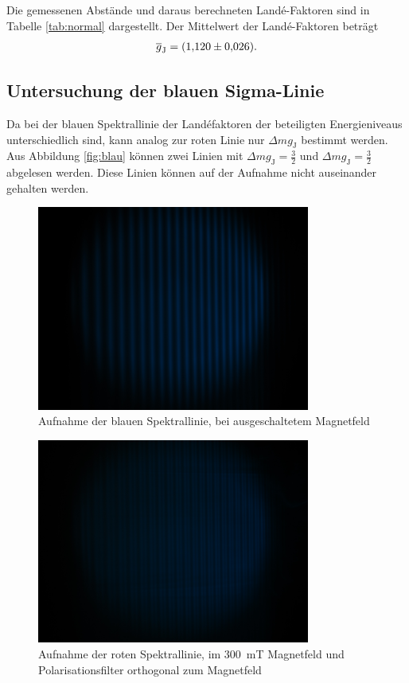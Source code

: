 Die gemessenen Abstände und daraus berechneten Landé-Faktoren sind in Tabelle \ref{tab:normal} dargestellt.
Der Mittelwert der Landé-Faktoren beträgt
\begin{align}
	\overline{g}_\text{J} = \SI{1.12 \pm 0.026}{}.
\end{align}

\subsection{Untersuchung der blauen Sigma-Linie}

Da bei der blauen Spektrallinie der Landéfaktoren der beteiligten Energieniveaus unterschiedlich sind, kann analog zur roten Linie nur $\Delta m g_\text{J}$ bestimmt werden.
Aus Abbildung \ref{fig:blau} können zwei Linien mit $\Delta m g_\text{J} = \frac{3}{2}$ und $\Delta m g_\text{J} = \frac{3}{2}$ abgelesen werden.
Diese Linien können auf der Aufnahme nicht auseinander gehalten werden.
\begin{figure}
	\centering
	\includegraphics[width=0.8\textwidth]{img/blau-0A.JPG}
	\caption{Aufnahme der blauen Spektrallinie, bei ausgeschaltetem Magnetfeld}
	\label{fig:blau1}
\end{figure}
\begin{figure}
	\centering
	\includegraphics[width=0.8\textwidth]{img/blau-5A-ortho.JPG}
	\caption{Aufnahme der roten Spektrallinie, im \SI{300}{\milli \tesla} Magnetfeld und Polarisationsfilter orthogonal zum Magnetfeld}
	\label{fig:blau2}
\end{figure}
